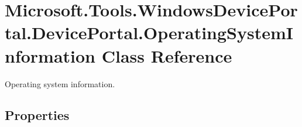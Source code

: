 \hypertarget{class_microsoft_1_1_tools_1_1_windows_device_portal_1_1_device_portal_1_1_operating_system_information}{}\section{Microsoft.\+Tools.\+Windows\+Device\+Portal.\+Device\+Portal.\+Operating\+System\+Information Class Reference}
\label{class_microsoft_1_1_tools_1_1_windows_device_portal_1_1_device_portal_1_1_operating_system_information}


Operating system information.  


\subsection*{Properties}
